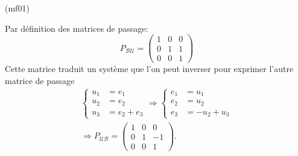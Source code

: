 \begin{tiny}(mf01)\end{tiny} Par définition des matrices de passage:
\begin{displaymath}
 P_{\mathcal{B} \mathcal{U}}=
\begin{pmatrix}
 1 & 0 & 0 \\ 0 & 1 & 1\\ 0 & 0 & 1
\end{pmatrix}
\end{displaymath}
Cette matrice traduit un système que l'on peut inverser pour exprimer l'autre matrice de passage
\begin{multline*}
 \left\lbrace 
\begin{aligned}
 u_1 &= e_1\\ u_2 &= e_2 \\ u_3 &= e_2+e_3
\end{aligned}
\right. 
\Rightarrow
 \left\lbrace 
\begin{aligned}
 e_1 &= u_1\\ e_2 &= u_2 \\ e_3 &= -u_2+u_3
\end{aligned}
\right. 
\\
\Rightarrow
 P_{\mathcal{U} \mathcal{B} }=
\begin{pmatrix}
 1 & 0 & 0 \\ 0 & 1 & -1\\ 0 & 0 & 1
\end{pmatrix}.
\end{multline*}
